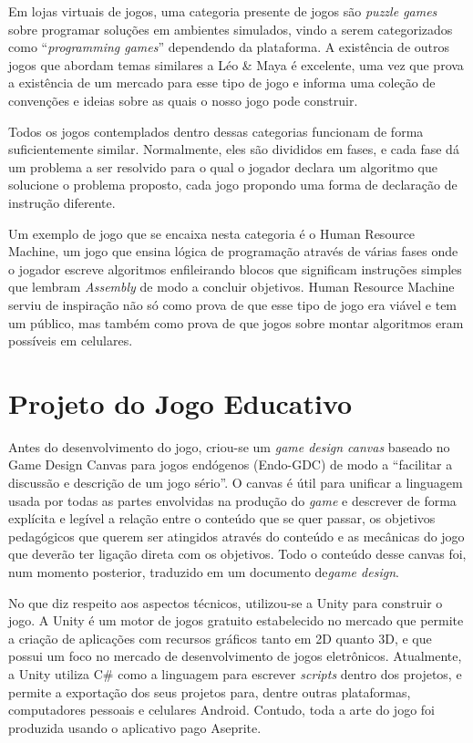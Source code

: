 \documentclass[conference]{IEEEtran}
\begin{document}
Em lojas virtuais de jogos, uma categoria presente de jogos são \textit{puzzle games} sobre programar soluções em ambientes simulados\cite{b15}\cite{b16}, vindo a serem categorizados como ``\textit{programming games}'' dependendo da plataforma\cite{b17}. A existência de outros jogos que abordam temas similares a Léo \& Maya é excelente, uma vez que prova a existência de um mercado para esse tipo de jogo e informa uma coleção de convenções e ideias sobre as quais o nosso jogo pode construir.

Todos os jogos contemplados dentro dessas categorias funcionam de forma suficientemente similar. Normalmente, eles são divididos em fases, e cada fase dá um problema a ser resolvido para o qual o jogador declara um algoritmo que solucione o problema proposto, cada jogo propondo uma forma de declaração de instrução diferente.

Um exemplo de jogo que se encaixa nesta categoria é o Human Resource Machine\cite{b18}, um jogo que ensina lógica de programação através de várias fases onde o jogador escreve algoritmos enfileirando blocos que significam instruções simples que lembram \textit{Assembly} de modo a concluir objetivos. Human Resource Machine serviu de inspiração não só como prova de que esse tipo de jogo era viável e tem um público, mas também como prova de que jogos sobre montar algoritmos eram possíveis em celulares.

\section{Projeto do Jogo Educativo}
Antes do desenvolvimento do jogo, criou-se um \textit{game design canvas} baseado no Game Design Canvas para jogos endógenos (Endo-GDC) de modo a ``facilitar a discussão e descrição de um jogo sério''\cite{b19}. O canvas é útil para unificar a linguagem usada por todas as partes envolvidas na produção do \textit{game} e descrever de forma explícita e legível a relação entre o conteúdo que se quer passar, os objetivos pedagógicos que querem ser atingidos através do conteúdo e as mecânicas do jogo que deverão ter ligação direta com os objetivos. Todo o conteúdo desse canvas foi, num momento posterior, traduzido em um documento de\textit{game design}.

No que diz respeito aos aspectos técnicos, utilizou-se a Unity\cite{b20} para construir o jogo. A Unity é um motor de jogos gratuito estabelecido no mercado que permite a criação de aplicações com recursos gráficos tanto em 2D quanto 3D, e que possui um foco no mercado de desenvolvimento de jogos eletrônicos. Atualmente, a Unity utiliza C\#\cite{b21} como a linguagem para escrever \textit{scripts} dentro dos projetos, e permite a exportação dos seus projetos para, dentre outras plataformas, computadores pessoais e celulares Android. Contudo, toda a arte do jogo foi produzida usando o aplicativo pago Aseprite\cite{b22}.
\end{document}

